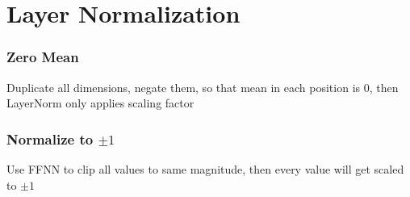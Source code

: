 \chapter{Layer Normalization}

\subsection{Zero Mean}

Duplicate all dimensions, negate them, so that mean in each position is $0$, then LayerNorm only applies scaling factor

\subsection{Normalize to $\pm1$}

Use FFNN to clip all values to same magnitude, then every value will get scaled to $\pm 1$